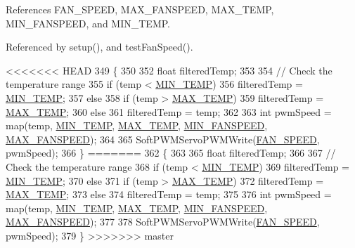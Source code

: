 \begin{DoxyCode}
\begin{DoxyCode}
\begin{DoxyCode}
References F\-A\-N\-\_\-\-S\-P\-E\-E\-D, M\-A\-X\-\_\-\-F\-A\-N\-S\-P\-E\-E\-D, M\-A\-X\-\_\-\-T\-E\-M\-P, M\-I\-N\-\_\-\-F\-A\-N\-S\-P\-E\-E\-D, and M\-I\-N\-\_\-\-T\-E\-M\-P.



Referenced by setup(), and test\-Fan\-Speed().


\begin{DoxyCode}
<<<<<<< HEAD
349                              \{
350   
352   \textcolor{keywordtype}{float} filteredTemp;
353   
354   \textcolor{comment}{// Check the temperature range}
355   \textcolor{keywordflow}{if} (temp < \hyperlink{_globals_8h_a2522d2568f63855838c3ecfb44084710}{MIN\_TEMP})
356     filteredTemp = \hyperlink{_globals_8h_a2522d2568f63855838c3ecfb44084710}{MIN\_TEMP};
357   \textcolor{keywordflow}{else}
358     \textcolor{keywordflow}{if} (temp > \hyperlink{_globals_8h_aed8ea54a2630aaf2ae3f2bd5fa886959}{MAX\_TEMP})
359       filteredTemp = \hyperlink{_globals_8h_aed8ea54a2630aaf2ae3f2bd5fa886959}{MAX\_TEMP};
360       \textcolor{keywordflow}{else}
361         filteredTemp = temp;
362   
363   \textcolor{keywordtype}{int} pwmSpeed = map(temp, \hyperlink{_globals_8h_a2522d2568f63855838c3ecfb44084710}{MIN\_TEMP}, \hyperlink{_globals_8h_aed8ea54a2630aaf2ae3f2bd5fa886959}{MAX\_TEMP}, \hyperlink{_globals_8h_a1ba666d06d08bf653b276d2207542cab}{MIN\_FANSPEED}, 
      \hyperlink{_globals_8h_ac9351f029741923529816df3678ea765}{MAX\_FANSPEED});
364   
365   SoftPWMServoPWMWrite(\hyperlink{_globals_8h_aa25a0ac569f39f937b5020cda2687799}{FAN\_SPEED}, pwmSpeed);
366 \}
=======
362                              \{
363   
365   \textcolor{keywordtype}{float} filteredTemp;
366   
367   \textcolor{comment}{// Check the temperature range}
368   \textcolor{keywordflow}{if} (temp < \hyperlink{_globals_8h_a2522d2568f63855838c3ecfb44084710}{MIN\_TEMP})
369     filteredTemp = \hyperlink{_globals_8h_a2522d2568f63855838c3ecfb44084710}{MIN\_TEMP};
370   \textcolor{keywordflow}{else}
371     \textcolor{keywordflow}{if} (temp > \hyperlink{_globals_8h_aed8ea54a2630aaf2ae3f2bd5fa886959}{MAX\_TEMP})
372       filteredTemp = \hyperlink{_globals_8h_aed8ea54a2630aaf2ae3f2bd5fa886959}{MAX\_TEMP};
373       \textcolor{keywordflow}{else}
374         filteredTemp = temp;
375   
376   \textcolor{keywordtype}{int} pwmSpeed = map(temp, \hyperlink{_globals_8h_a2522d2568f63855838c3ecfb44084710}{MIN\_TEMP}, \hyperlink{_globals_8h_aed8ea54a2630aaf2ae3f2bd5fa886959}{MAX\_TEMP}, \hyperlink{_globals_8h_a1ba666d06d08bf653b276d2207542cab}{MIN\_FANSPEED}, 
      \hyperlink{_globals_8h_ac9351f029741923529816df3678ea765}{MAX\_FANSPEED});
377   
378   SoftPWMServoPWMWrite(\hyperlink{_globals_8h_aa25a0ac569f39f937b5020cda2687799}{FAN\_SPEED}, pwmSpeed);
379 \}
>>>>>>> master
\end{DoxyCode}
\hypertarget{_meditech___chip_kit_control_panel_8pde_aac6d40e9f46456f3b2d16f2fe64004cc}{
}
\end{DoxyCode}
\end{DoxyCode}
\end{DoxyCode}
